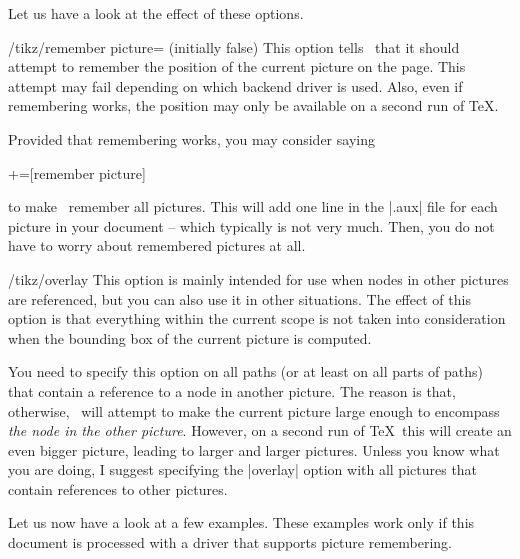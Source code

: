 Let us have a look at the effect of these options.
\begin{key}{/tikz/remember picture= (initially false)}
  This option tells \tikzname\ that it should attempt to remember the
  position of the current picture on the page. This attempt may fail
  depending on which backend driver is used. Also, even if remembering
  works, the position may only be available on a second run of \TeX.

  Provided that remembering works, you may consider saying
\begin{codeexample}
+=[remember picture]
\end{codeexample}
  to make \tikzname\ remember all pictures. This will add one line in
  the |.aux| file for each picture in your document -- which typically
  is not very much. Then, you do not have to worry about remembered
  pictures at all.
\end{key}

\begin{key}{/tikz/overlay}
  This option is mainly intended for use when nodes in other pictures
  are referenced, but you can also use it in other situations. The
  effect of this option is that everything within the current scope is
  not taken into consideration when the bounding box of the current
  picture is computed.

  You need to specify this option on all paths (or at least on all
  parts of paths) that contain a reference to a node in another
  picture. The reason is that, otherwise, \tikzname\ will attempt to
  make the current picture large enough to encompass \emph{the node in
    the other picture}. However, on a second run of \TeX\ this will
  create an even bigger picture, leading to larger and larger
  pictures. Unless you know what you are doing, I suggest specifying
  the |overlay| option with all pictures that contain references to
  other pictures.
\end{key}

Let us now have a look at a few examples. These examples work only if
this document is processed with a driver that supports picture
remembering.
\medskip

